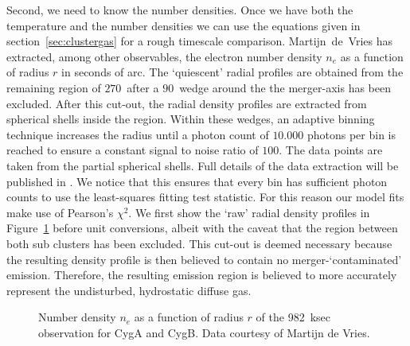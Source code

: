 \documentclass[MScProj_TLRH_ClusterEnergy.tex]{subfiles}
\begin{document}
Second, we need to know the number densities. Once we have both the temperature
and the number densities we can use the equations given in 
section~\ref{sec:clustergas} for a rough timescale comparison. Martijn~de~Vries 
has extracted, among other observables, the electron number density $n_e$ as a 
function of radius $r$ in seconds of arc. The `quiescent' radial profiles are
obtained from the remaining region of $270$\deg \, after a $90$\deg \, wedge 
around the the merger-axis has been excluded. After this cut-out, the radial
density profiles are extracted from spherical shells inside the region. Within
these wedges, an adaptive binning technique increases the radius until a photon
count of $10.000$ photons per bin is reached to ensure a constant signal to 
noise ratio of $100$. The data points are taken from the partial spherical 
shells. Full details of the data extraction will be published in 
\citet[in prep]{2016MNRAS.123..456W}. We notice that this ensures that every bin
has sufficient photon counts to use the least-squares fitting test statistic.
For this reason our model fits make use of Pearson's $\chi^2$. We first show the 
`raw' radial density profiles in Figure~\ref{fig:raw_data} before unit conversions,
albeit with the caveat that the region between both sub clusters has been excluded.
This cut-out is deemed necessary because the resulting density profile is then 
believed to contain no merger-`contaminated' emission. Therefore, the resulting
emission region is believed to more accurately represent the undisturbed, 
hydrostatic diffuse gas.


\begin{figure}
    \centering
    \caption{Number density $n_e$ as a function of radius $r$ of the
    982~ksec  observation \newline
    \citep[in prep]{2016MNRAS.123..456W} for CygA and CygB. Data courtesy of
    Martijn de Vries.}
    \label{fig:raw_data}
\end{figure}
\end{document}
